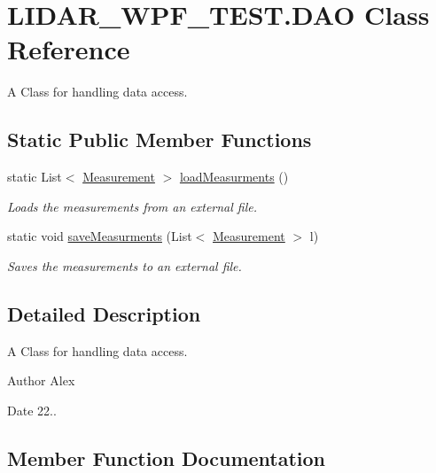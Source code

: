 \hypertarget{class_l_i_d_a_r___w_p_f___t_e_s_t_1_1_d_a_o}{}\section{L\+I\+D\+A\+R\+\_\+\+W\+P\+F\+\_\+\+T\+E\+S\+T.\+D\+A\+O Class Reference}
\label{class_l_i_d_a_r___w_p_f___t_e_s_t_1_1_d_a_o}


A Class for handling data access.  


\subsection*{Static Public Member Functions}
\begin{DoxyCompactItemize}
\item 
static List$<$ \hyperlink{class_l_i_d_a_r___w_p_f___t_e_s_t_1_1_measurement}{Measurement} $>$ \hyperlink{class_l_i_d_a_r___w_p_f___t_e_s_t_1_1_d_a_o_ab7924466198f989279a6daae50725a79}{load\+Measurments} ()
\begin{DoxyCompactList}\small\item\em Loads the measurements from an external file. \end{DoxyCompactList}\item 
static void \hyperlink{class_l_i_d_a_r___w_p_f___t_e_s_t_1_1_d_a_o_a96d7638ea46b651b6ebbd536d6284a77}{save\+Measurments} (List$<$ \hyperlink{class_l_i_d_a_r___w_p_f___t_e_s_t_1_1_measurement}{Measurement} $>$ l)
\begin{DoxyCompactList}\small\item\em Saves the measurements to an external file. \end{DoxyCompactList}\end{DoxyCompactItemize}


\subsection{Detailed Description}
A Class for handling data access. 

\begin{DoxyAuthor}{Author}
Alex 
\end{DoxyAuthor}
\begin{DoxyDate}{Date}
22.. 
\end{DoxyDate}


\subsection{Member Function Documentation}
\hypertarget{class_l_i_d_a_r___w_p_f___t_e_s_t_1_1_d_a_o_ab7924466198f989279a6daae50725a79}{}
